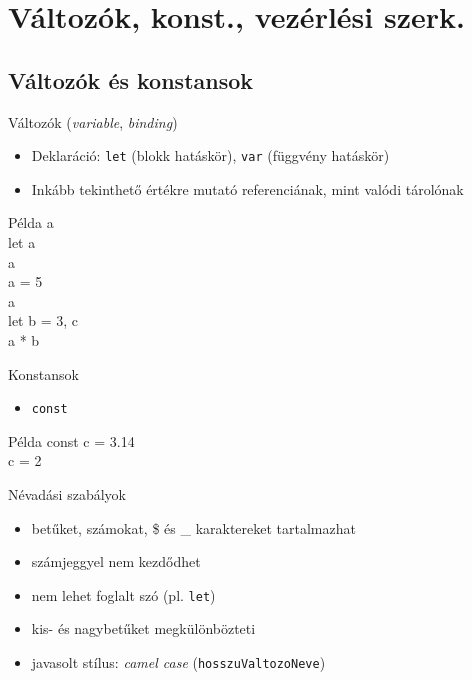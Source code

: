 \section{Változók, konst., vezérlési szerk.}

\subsection{Változók és konstansok}

\begin{frame}
    Változók (\emph{variable}, \emph{binding})
    \begin{itemize}
        \item Deklaráció: \texttt{let} (blokk hatáskör), \texttt{var} (függvény hatáskör)
        \item Inkább tekinthető értékre mutató referenciának, mint valódi tárolónak
    \end{itemize}
    \begin{exampleblock}{Példa}
        a \\
        let a\\
        a \\
        a = 5\\
        a \\
        let b = 3, c\\
        a * b \\
    \end{exampleblock}
\end{frame}

\begin{frame}
    Konstansok
    \begin{itemize}
        \item \texttt{const}
    \end{itemize}
    \begin{exampleblock}{Példa}
        const c = 3.14\\
        c = 2 
    \end{exampleblock}
    \vfill
    Névadási szabályok
    \begin{itemize}
        \item betűket, számokat, \$ és \_ karaktereket tartalmazhat
        \item számjeggyel nem kezdődhet
        \item nem lehet foglalt szó (pl. \texttt{let})
        \item kis- és nagybetűket megkülönbözteti
        \item javasolt stílus: \emph{camel case} (\texttt{hosszuValtozoNeve})
    \end{itemize}
\end{frame}

